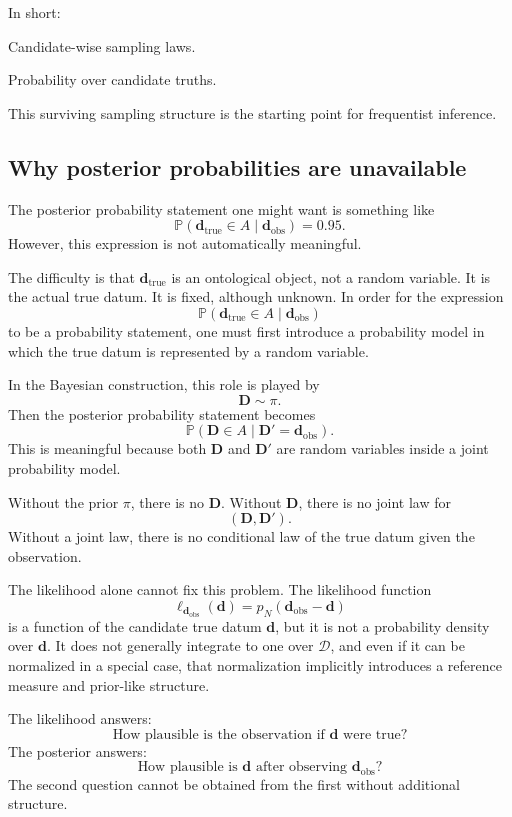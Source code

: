 \documentclass[11pt]{article}
\newcommand{\Dspace}{\mathcal D}
\newcommand{\prior}{\pi}
\newcommand{\Drand}{\mathbf D}
\newcommand{\Dobsrand}{\mathbf D'}
\newcommand{\dtrue}{\mathbf d_{\mathrm{true}}}
\newcommand{\dobs}{\mathbf d_{\mathrm{obs}}}
\newcommand{\Prob}{\mathbb P}
\begin{document}
In short:
\begin{description}[leftmargin=3.2cm,style=nextline]
    \item[Survives.]
    Candidate-wise sampling laws.

    \item[Collapses.]
    Probability over candidate truths.
\end{description}

This surviving sampling structure is the starting point for frequentist inference.

\subsection{Why posterior probabilities are unavailable}

The posterior probability statement one might want is something like
\[
    \Prob(\dtrue\in A\mid \dobs)=0.95.
\]
However, this expression is not automatically meaningful.

The difficulty is that \(\dtrue\) is an ontological object, not a random variable. It is the actual true datum. It is fixed, although unknown. In order for the expression
\[
    \Prob(\dtrue\in A\mid \dobs)
\]
to be a probability statement, one must first introduce a probability model in which the true datum is represented by a random variable.

In the Bayesian construction, this role is played by
\[
    \Drand\sim\prior.
\]
Then the posterior probability statement becomes
\[
    \Prob(\Drand\in A\mid \Dobsrand=\dobs).
\]
This is meaningful because both \(\Drand\) and \(\Dobsrand\) are random variables inside a joint probability model.

Without the prior \(\prior\), there is no \(\Drand\). Without \(\Drand\), there is no joint law for
\[
    (\Drand,\Dobsrand).
\]
Without a joint law, there is no conditional law of the true datum given the observation.

The likelihood alone cannot fix this problem. The likelihood function
\[
    \ell_{\dobs}(\mathbf d)
    =
    p_N(\dobs-\mathbf d)
\]
is a function of the candidate true datum \(\mathbf d\), but it is not a probability density over \(\mathbf d\). It does not generally integrate to one over \(\Dspace\), and even if it can be normalized in a special case, that normalization implicitly introduces a reference measure and prior-like structure.

The likelihood answers:
\[
    \text{How plausible is the observation if } \mathbf d \text{ were true?}
\]
The posterior answers:
\[
    \text{How plausible is } \mathbf d \text{ after observing } \dobs?
\]
The second question cannot be obtained from the first without additional structure.
\end{document}
